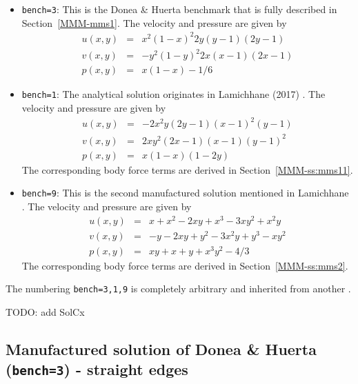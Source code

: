 \begin{itemize}
\item {\tt bench=3}: 
This is the Donea \& Huerta benchmark that is fully described in Section~\ref{MMM-mms1}.
The velocity and pressure are given by
\begin{eqnarray}
u(x,y) &=& x^2(1-x)^2 2y (y-1)(2y-1) \\ 
v(x,y) &=& -y^2 (1 - y)^2 2x (x-1)(2x-1) \\ 
p(x,y) &=& x(1 -x)- 1/6 
\end{eqnarray}

\item {\tt bench=1}:  
The analytical solution originates in Lamichhane (2017) \cite{lami17}.
The velocity and pressure are given by
\begin{eqnarray}
u(x,y)&=&-2x^2y(2y-1)(x-1)^2(y-1) \\
v(x,y)&=& 2xy^2(2x-1)(x-1)(y-1)^2 \\
p(x,y)&=& x(1-x)(1-2y)
\end{eqnarray}
The corresponding body force terms are derived in Section~\ref{MMM-ss:mms11}. 

\item {\tt bench=9}: 
This is the second manufactured solution 
mentioned in Lamichhane \cite{lami17}. 
The velocity and pressure are given by
\begin{eqnarray}
u(x,y) &=& x+x^2 - 2xy+x^3 - 3xy^2 + x^2y \\
v(x,y) &=& -y-2xy+y^2 -3x^2y + y^3 - xy^2 \\
p(x,y) &=& xy+x+y+x^3y^2 - 4/3
\end{eqnarray}
The corresponding body force terms are derived in Section~\ref{MMM-ss:mms2}. 
\end{itemize}

The numbering {\tt bench=3,1,9} is completely arbitrary and inherited from another \stone.

TODO: add SolCx


\newpage
\subsection*{Manufactured solution of Donea \& Huerta ({\tt bench=3}) - straight edges}

